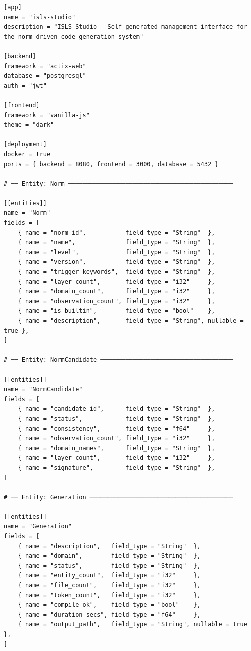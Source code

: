 \documentclass[11pt,a4paper]{article}
\begin{document}
\begin{lstlisting}[style=toml]
[app]
name = "isls-studio"
description = "ISLS Studio — Self-generated management interface for the norm-driven code generation system"

[backend]
framework = "actix-web"
database = "postgresql"
auth = "jwt"

[frontend]
framework = "vanilla-js"
theme = "dark"

[deployment]
docker = true
ports = { backend = 8080, frontend = 3000, database = 5432 }

# ── Entity: Norm ──────────────────────────────────────────────

[[entities]]
name = "Norm"
fields = [
    { name = "norm_id",           field_type = "String"  },
    { name = "name",              field_type = "String"  },
    { name = "level",             field_type = "String"  },
    { name = "version",           field_type = "String"  },
    { name = "trigger_keywords",  field_type = "String"  },
    { name = "layer_count",       field_type = "i32"     },
    { name = "domain_count",      field_type = "i32"     },
    { name = "observation_count", field_type = "i32"     },
    { name = "is_builtin",        field_type = "bool"    },
    { name = "description",       field_type = "String", nullable = true },
]

# ── Entity: NormCandidate ─────────────────────────────────────

[[entities]]
name = "NormCandidate"
fields = [
    { name = "candidate_id",      field_type = "String"  },
    { name = "status",            field_type = "String"  },
    { name = "consistency",       field_type = "f64"     },
    { name = "observation_count", field_type = "i32"     },
    { name = "domain_names",      field_type = "String"  },
    { name = "layer_count",       field_type = "i32"     },
    { name = "signature",         field_type = "String"  },
]

# ── Entity: Generation ────────────────────────────────────────

[[entities]]
name = "Generation"
fields = [
    { name = "description",   field_type = "String"  },
    { name = "domain",        field_type = "String"  },
    { name = "status",        field_type = "String"  },
    { name = "entity_count",  field_type = "i32"     },
    { name = "file_count",    field_type = "i32"     },
    { name = "token_count",   field_type = "i32"     },
    { name = "compile_ok",    field_type = "bool"    },
    { name = "duration_secs", field_type = "f64"     },
    { name = "output_path",   field_type = "String", nullable = true },
]


\end{lstlisting}
\end{document}
